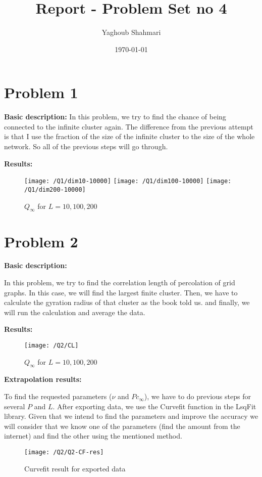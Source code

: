 \documentclass{article}
\author{Yaghoub Shahmari}
\title{Report - Problem Set no 4}
\date{\today}
\begin{document}
    \maketitle
    \section*{Problem 1}
    \textbf{Basic description:}
    In this problem, we try to find the chance of being connected to the infinite cluster again.
    The difference from the previous attempt is that I use the fraction of the size of the infinite
    cluster to the size of the whole network. So all of the previous steps will go through.

    \textbf{Results:}

    \begin{figure}[!htb]
        \centering
        \texttt{[image: /Q1/dim10-10000]}
        \label{fig:1.1}
        \texttt{[image: /Q1/dim100-10000]}
        \label{fig:1.2}
        \texttt{[image: /Q1/dim200-10000]}
        \label{fig:1.3}
        \caption{$Q_{\infty}$ for $L=10, 100, 200$}
    \end{figure}

    \pagebreak

    \section*{Problem 2}
    \textbf{Basic description:}

    In this problem, we try to find the correlation length of percolation of grid graphs.
    In this case, we will find the largest finite cluster.
    Then, we have to calculate the gyration radius of that cluster as the book told us.
    and finally, we will run the calculation and average the data.

    \textbf{Results:}

    \begin{figure}[!htb]
        \centering
        \texttt{[image: /Q2/CL]}
        \label{fig:2.1}
        \caption{$Q_{\infty}$ for $L=10, 100, 200$}
    \end{figure}

    \textbf{Extrapolation results:}

    To find the requested parameters ($\nu$ and $Pc_{\infty}$),
    we have to do previous steps for several $P$ and $L$.
    After exporting data, we use the Curvefit function in the LsqFit library.
    Given that we intend to find the parameters and improve the
    accuracy we will consider that we know one of the parameters (find the amount from the internet)
    and find the other using the mentioned method.

    \begin{figure}[!htb]
        \centering
        \texttt{[image: /Q2/Q2-CF-res]}
        \label{fig:2.2}
        \caption{Curvefit result for exported data}
    \end{figure}
    
\end{document}
